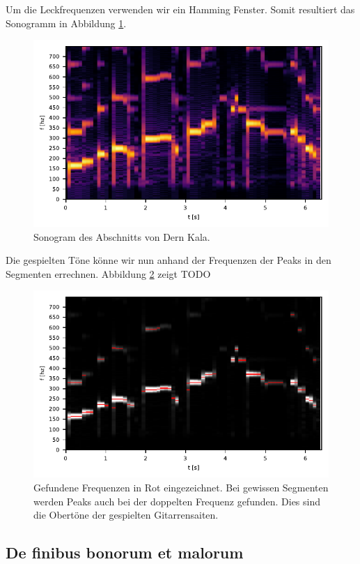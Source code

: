 Um die Leckfrequenzen verwenden wir ein Hamming Fenster.
Somit resultiert das Sonogramm in Abbildung \ref{sonogramm:dernSono}.


\begin{figure}
    \centering
    \includegraphics{papers/sonogramm/images/dernSono1.pdf}
    \caption{Sonogram des Abschnitts von Dern Kala.
    \label{sonogramm:dernSono}
    }
\end{figure}

Die gespielten Töne könne wir nun anhand der Frequenzen 
der Peaks in den Segmenten errechnen.
Abbildung \ref{sonogramm:dernSonoPeaks} zeigt TODO

\begin{figure}
    \centering
    \includegraphics{papers/sonogramm/images/dernSonoPeaks.pdf}
    \caption{Gefundene Frequenzen in Rot eingezeichnet. Bei gewissen 
    Segmenten werden Peaks auch bei der doppelten Frequenz gefunden.
    Dies sind die Obertöne der gespielten Gitarrensaiten.
    \label{sonogramm:dernSonoPeaks}
    }
\end{figure}

\subsection{De finibus bonorum et malorum
\label{sonogramm:subsection:bonorum}}


